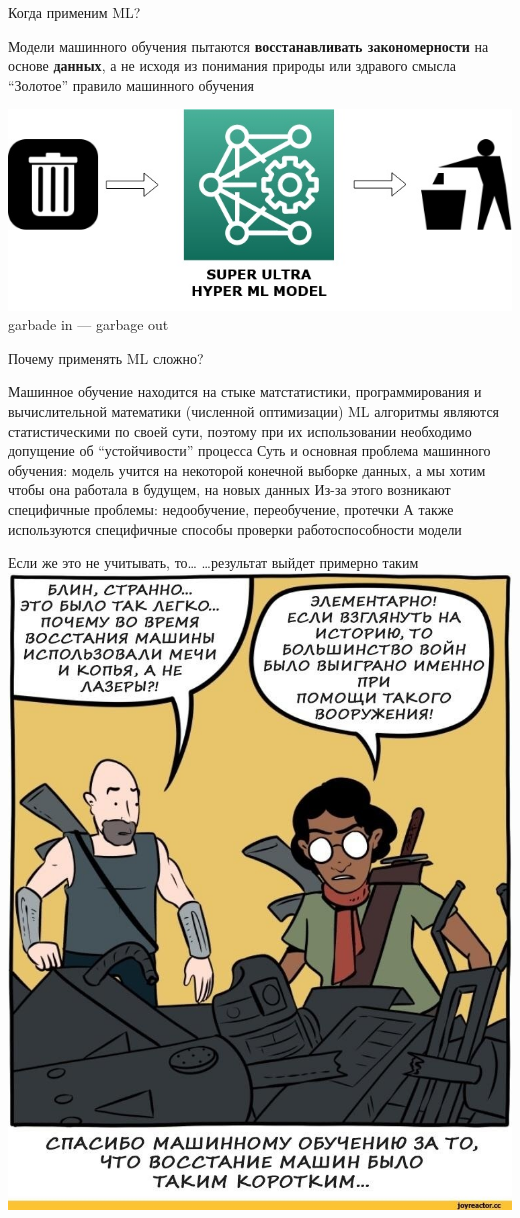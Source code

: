 \documentclass[aspectratio=169, professionalfonts]{beamer}
\begin{document}
\begin{frame}{Когда применим ML?}
    \begin{outline}
        \1 Модели машинного обучения пытаются \textbf{восстанавливать закономерности} на
        основе \textbf{данных}, а не исходя из понимания природы или здравого смысла
        \1 ``Золотое'' правило машинного обучения
    \end{outline}
    \begin{center}
        \includegraphics[width=.49\linewidth]{graphs/fig20.jpg} \\
        garbade in --- garbage out
    \end{center}
\end{frame}

\begin{frame}{Почему применять ML сложно?}
    \begin{outline}
        \1 Машинное обучение находится на стыке матстатистики, программирования и
        вычислительной математики (численной оптимизации)
        \pause
        \1 ML алгоритмы являются статистическими по своей сути, поэтому при их
        использовании необходимо допущение об ``устойчивости'' процесса
        \pause
        \1 Суть и основная проблема машинного обучения: модель учится на некоторой
        конечной выборке данных, а мы хотим чтобы она работала в будущем, на
        новых данных
        \pause
        \1 Из-за этого возникают специфичные проблемы: недообучение,
        переобучение, протечки
        \pause
        \1 А также используются специфичные способы проверки работоспособности модели
    \end{outline}
\end{frame}

\begin{frame}{Если же это не учитывать, то\ldots}
    \centering
    \ldots результат выйдет примерно таким \\
    \includegraphics[width=.34\linewidth]{graphs/fig21.jpg}
\end{frame}
\end{document}
